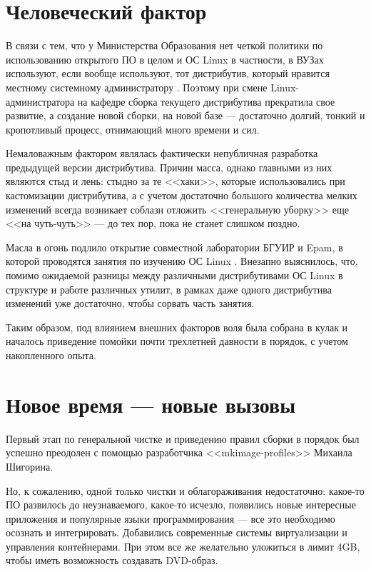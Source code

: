 \documentclass[10pt, a5paper]{article}
\begin{document}
\section*{Человеческий фактор}

В связи с тем, что у Министерства Образования нет четкой политики по использованию открытого ПО в целом и ОС Linux в частности, в ВУЗах используют, если вообще используют, тот дистрибутив, который нравится местному системному администратору \cite{DKP01}. Поэтому при смене Linux-администратора на кафедре сборка текущего дистрибутива прекратила свое развитие, а создание новой сборки, на новой базе --- достаточно долгий, тонкий и кропотливый процесс, отнимающий много времени и сил.

Немаловажным фактором являлась фактически непубличная разработка предыдущей версии дистрибутива. Причин масса, однако главными из них являются стыд и лень: стыдно за те <<хаки>>, которые использовались при кастомизации дистрибутива, а с учетом достаточно большого количества мелких изменений всегда возникает соблазн отложить <<генеральную уборку>> еще <<на чуть-чуть>> --- до тех пор, пока не станет слишком поздно.

Масла в огонь подлило открытие совместной лаборатории \linebreak БГУИР и Epam, в которой проводятся занятия по изучению ОС Linux \cite{PS01}.  Внезапно выяснилось, что, помимо ожидаемой разницы между различными дистрибутивами ОС Linux в структуре и работе различных утилит, в рамках даже одного дистрибутива изменений уже достаточно, чтобы сорвать часть занятия.

Таким образом, под влиянием внешних факторов воля была собрана в кулак и началось приведение помойки почти трехлетней давности в порядок, с учетом накопленного опыта.

\section*{Новое время --- новые вызовы}

Первый этап по генеральной чистке и приведению правил сборки в порядок был успешно преодолен с помощью разработчика <<mkimage-profiles>> Михаила Шигорина.

Но, к сожалению, одной только чистки и облагораживания недостаточно: какое-то ПО развилось до неузнаваемого, какое-то исчезло, появились новые интересные приложения и популярные языки программирования --- все это необходимо осознать и интегрировать. Добавились современные системы виртуализации и управления контейнерами. При этом все же желательно уложиться в лимит 4GB, чтобы иметь возможность создавать DVD-образ.
\end{document}
